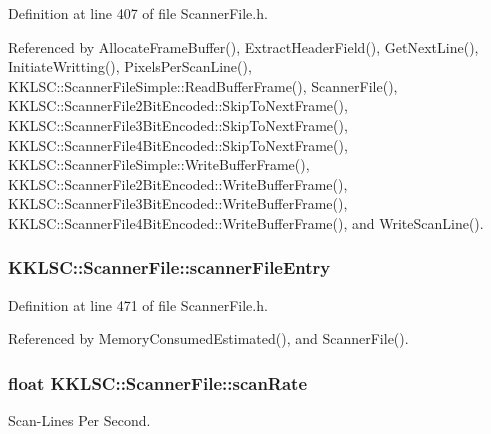 Definition at line 407 of file Scanner\+File.\+h.



Referenced by Allocate\+Frame\+Buffer(), Extract\+Header\+Field(), Get\+Next\+Line(), Initiate\+Writting(), Pixels\+Per\+Scan\+Line(), K\+K\+L\+S\+C\+::\+Scanner\+File\+Simple\+::\+Read\+Buffer\+Frame(), Scanner\+File(), K\+K\+L\+S\+C\+::\+Scanner\+File2\+Bit\+Encoded\+::\+Skip\+To\+Next\+Frame(), K\+K\+L\+S\+C\+::\+Scanner\+File3\+Bit\+Encoded\+::\+Skip\+To\+Next\+Frame(), K\+K\+L\+S\+C\+::\+Scanner\+File4\+Bit\+Encoded\+::\+Skip\+To\+Next\+Frame(), K\+K\+L\+S\+C\+::\+Scanner\+File\+Simple\+::\+Write\+Buffer\+Frame(), K\+K\+L\+S\+C\+::\+Scanner\+File2\+Bit\+Encoded\+::\+Write\+Buffer\+Frame(), K\+K\+L\+S\+C\+::\+Scanner\+File3\+Bit\+Encoded\+::\+Write\+Buffer\+Frame(), K\+K\+L\+S\+C\+::\+Scanner\+File4\+Bit\+Encoded\+::\+Write\+Buffer\+Frame(), and Write\+Scan\+Line().

\subsubsection[{\texorpdfstring{scanner\+File\+Entry}{scannerFileEntry}}]{ K\+K\+L\+S\+C\+::\+Scanner\+File\+::scanner\+File\+Entry\hspace{0.3cm}{\ttfamily [protected]}}\hypertarget{class_k_k_l_s_c_1_1_scanner_file_a22190bfe80266f710f0a32a13e149381}{}\label{class_k_k_l_s_c_1_1_scanner_file_a22190bfe80266f710f0a32a13e149381}


Definition at line 471 of file Scanner\+File.\+h.



Referenced by Memory\+Consumed\+Estimated(), and Scanner\+File().

\subsubsection[{\texorpdfstring{scan\+Rate}{scanRate}}]{\setlength{\rightskip}{0pt plus 5cm}float K\+K\+L\+S\+C\+::\+Scanner\+File\+::scan\+Rate\hspace{0.3cm}{\ttfamily [protected]}}\hypertarget{class_k_k_l_s_c_1_1_scanner_file_aaf61fcf404e9dea9adc342bfd520a1f2}{}\label{class_k_k_l_s_c_1_1_scanner_file_aaf61fcf404e9dea9adc342bfd520a1f2}
Scan-\/\+Lines Per Second. 

